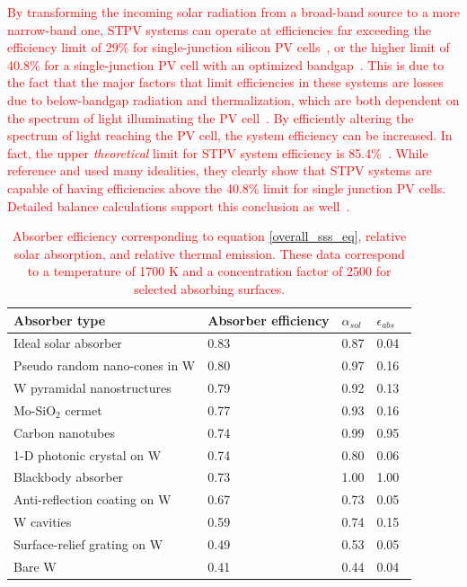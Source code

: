 \documentclass[review]{elsarticle}
\begin{document}
\textcolor{red}{By transforming the incoming solar radiation from a
broad-band source to a more narrow-band one, STPV systems can operate at
efficiencies far exceeding the efficiency limit of 29\%
for single-junction silicon PV cells~\cite{scranton_from_gupta}, or the
higher limit of 40.8\% for a single-junction PV cell with an optimized
bandgap~\cite{opt_BG}.  This is due to the fact that the major factors
that limit efficiencies in these systems are losses due to below-bandgap
radiation and thermalization, which are both dependent on the spectrum of
light illuminating the PV cell~\cite{SQ}.  By efficiently altering the
spectrum of light reaching the PV cell, the system efficiency can be
increased.  In fact, the upper {\it theoretical} limit for STPV system
efficiency is 85.4\%~\cite{Therm_stabil_W_microstructures}.  While
reference \cite{RF_OptExp_2009} and \cite{global_opt} used many
idealities, they clearly show that STPV systems are capable of having
efficiencies above the 40.8\% limit for single junction PV cells.
Detailed balance calculations support this conclusion as well~\cite{g5}.}
\begin{table}
	\caption{\textcolor{red}{Absorber efficiency corresponding to equation \ref{overall_sss_eq}, relative solar absorption, and relative thermal emission. 
These data correspond to a temperature of 1700 K and a concentration factor of 2500 for selected absorbing surfaces.}}
	\label{abs_eff_table}
	\begin{center}
		\begin{tabular}{|llll|}
			\hline
			Absorber type & Absorber efficiency & $\alpha_{sol}$ & $\epsilon_{abs}$\\
			\hline	
			Ideal solar absorber & 0.83 & 0.87 & 0.04\\
			Pseudo random nano-cones in W & 0.80 & 0.97 & 0.16~\cite{me1}\\
			W pyramidal nanostructures & 0.79 & 0.92 & 0.13~\cite{paper1_ref4}\\
			Mo-SiO$_2$ cermet & 0.77 & 0.93 & 0.16~\cite{cermet6}\\
			Carbon nanotubes & 0.74 & 0.99 & 0.95~\cite{MIT_paper,nnnNature}\\
			1-D photonic crystal on W & 0.74 & 0.80 & 0.06~\cite{SKY_JPE_2015}\\
			Blackbody absorber & 0.73 & 1.00 & 1.00\\
			Anti-reflection coating on W & 0.67 & 0.73 & 0.05~\cite{SKY_JPE_2015}\\
			W cavities & 0.59 & 0.74 & 0.15~\cite{exp_russia}\\
			Surface-relief grating on W & 0.49 & 0.53 & 0.05~\cite{paper1_ref6}\\
			Bare W & 0.41 & 0.44 & 0.04~\cite{Palik}\\
			\hline
		\end{tabular}
	\end{center}
\end{table}
\end{document}
